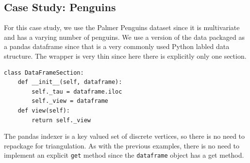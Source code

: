 \documentclass[../main.tex]{subfiles}
\begin{document}
\subsection{Case Study: Penguins}
For this case study, we use the Palmer Penguins dataset\cite{gormanEcologicalSexualDimorphism2014, horstPalmerpenguinsPalmerArchipelago2020} since it is multivariate and has a varying number of penguins. We use a version of the data packaged as a pandas dataframe\cite{nakhaeeMcnakhaeePalmerpenguins2021, jeff_reback_2020_3715232} since that is a very commonly used Python labled data structure. The wrapper is very thin since here there is explicitly only one section.
\begin{verbatim}
class DataFrameSection:
    def __init__(self, dataframe):
        self._tau = dataframe.iloc
        self._view = dataframe
    def view(self):
        return self._view
\end{verbatim}
The pandas indexer is a key valued set of discrete vertices, so there is no need to repackage for triangulation. As with the previous examples, there is no need to implement an explicit \texttt{get} method since the \texttt{dataframe} object has a get method. 
\end{document}
